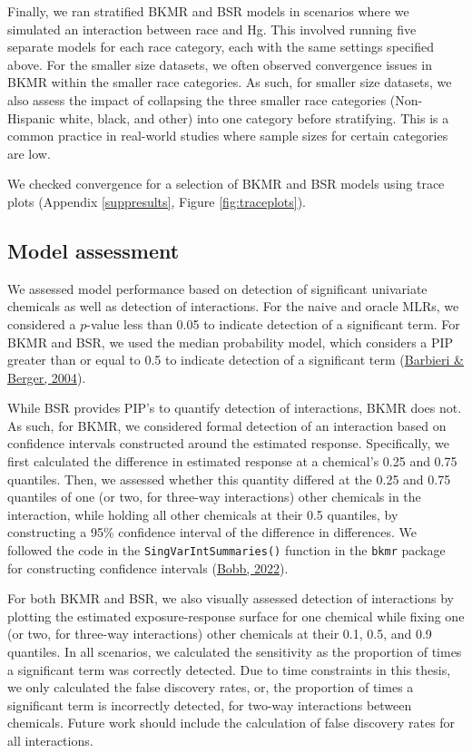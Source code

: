 \documentclass[12pt, twoside]{amherstthesis}
\begin{document}
Finally, we ran stratified BKMR and BSR models in scenarios where we simulated an interaction between race and Hg. This involved running five separate models for each race category, each with the same settings specified above. For the smaller size datasets, we often observed convergence issues in BKMR within the smaller race categories. As such, for smaller size datasets, we also assess the impact of collapsing the three smaller race categories (Non-Hispanic white, black, and other) into one category before stratifying. This is a common practice in real-world studies where sample sizes for certain categories are low.

We checked convergence for a selection of BKMR and BSR models using trace plots (Appendix \ref{suppresults}, Figure \ref{fig:traceplots}).

\hypertarget{model-assessment}{%
\subsection{Model assessment}\label{model-assessment}}

We assessed model performance based on detection of significant univariate chemicals as well as detection of interactions. For the naive and oracle MLRs, we considered a \(p\)-value less than 0.05 to indicate detection of a significant term. For BKMR and BSR, we used the median probability model, which considers a PIP greater than or equal to 0.5 to indicate detection of a significant term (\protect\hyperlink{ref-barbieri_optimal_2004}{Barbieri \& Berger, 2004}).

While BSR provides PIP's to quantify detection of interactions, BKMR does not. As such, for BKMR, we considered formal detection of an interaction based on confidence intervals constructed around the estimated response. Specifically, we first calculated the difference in estimated response at a chemical's 0.25 and 0.75 quantiles. Then, we assessed whether this quantity differed at the 0.25 and 0.75 quantiles of one (or two, for three-way interactions) other chemicals in the interaction, while holding all other chemicals at their 0.5 quantiles, by constructing a 95\% confidence interval of the difference in differences. We followed the code in the \texttt{SingVarIntSummaries()} function in the \texttt{bkmr} package for constructing confidence intervals (\protect\hyperlink{ref-bobb_bkmr_2022}{Bobb, 2022}).

For both BKMR and BSR, we also visually assessed detection of interactions by plotting the estimated exposure-response surface for one chemical while fixing one (or two, for three-way interactions) other chemicals at their 0.1, 0.5, and 0.9 quantiles. In all scenarios, we calculated the sensitivity as the proportion of times a significant term was correctly detected. Due to time constraints in this thesis, we only calculated the false discovery rates, or, the proportion of times a significant term is incorrectly detected, for two-way interactions between chemicals. Future work should include the calculation of false discovery rates for all interactions.
\end{document}
